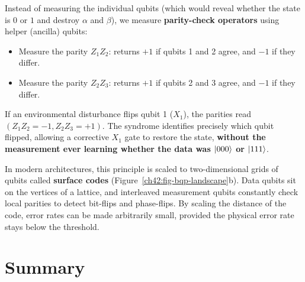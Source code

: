 Instead of measuring the individual qubits (which would reveal whether the state is $0$
or $1$ and destroy $\alpha$ and $\beta$), we measure \textbf{parity-check operators}
using helper (ancilla) qubits:
\begin{itemize}
  \item Measure the parity $Z_1 Z_2$: returns $+1$ if qubits 1 and 2 agree, and $-1$ if they differ.
  \item Measure the parity $Z_2 Z_3$: returns $+1$ if qubits 2 and 3 agree, and $-1$ if they differ.
\end{itemize}
If an environmental disturbance flips qubit 1 ($X_1$), the parities read
$(Z_1 Z_2 = -1, Z_2 Z_3 = +1)$. The syndrome identifies precisely which qubit flipped,
allowing a corrective $X_1$ gate to restore the state, \textbf{without the measurement
ever learning whether the data was $\lvert 000 \rangle$ or $\lvert 111 \rangle$}.

In modern architectures, this principle is scaled to two-dimensional grids of qubits called
\textbf{surface codes} (Figure~\ref{ch42:fig-bqp-landscape}b). Data qubits sit on the vertices
of a lattice, and interleaved measurement qubits constantly check local parities to detect
bit-flips and phase-flips. By scaling the distance of the code, error rates can be made
arbitrarily small, provided the physical error rate stays below the threshold.

\section{Summary}

